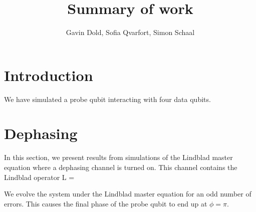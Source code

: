 


\usepackage{url}
\usepackage{amsmath}
\usepackage{graphicx}
\usepackage[font=footnotesize]{caption}
\usepackage{subcaption}
\usepackage[]{microtype}
\usepackage{balance}
\usepackage{cite}
\usepackage{braket}
\usepackage{braket}
\usepackage{siunitx}


\title{Summary of work}
\author{Gavin Dold, Sofia Qvarfort, Simon Schaal}
\maketitle
\tableofcontents
\section{Introduction}
We have simulated a probe qubit interacting with four data qubits. 


\section{Dephasing}
In this section, we present results from simulations of the Lindblad master equation where a dephasing channel is turned on. This channel contains the Lindblad operator
\beq
L  = 
\eeq

We evolve the system under the Lindblad master equation for an odd number of errors. This causes the final phase of the probe qubit to end up at $\phi = \pi$. 

